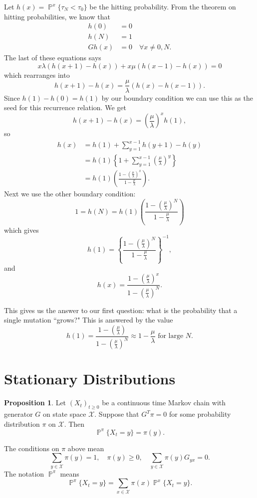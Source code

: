 \documentclass{article}
\theoremstyle{definition}
\newtheorem{prop}{Proposition}
\DeclareMathOperator{\p}{\mathbb{P}}
\begin{document}
Let $h(x) = \p^x\{\tau_N<\tau_0\}$ be the hitting probability. From the theorem on hitting probabilities, we know that 
\begin{align*}
	h(0) &= 0 \\
	h(N) &= 1\\
	Gh(x) &= 0 \quad \forall x\neq 0, N.
\end{align*}
The last of these equations says
\[
	x\lambda (h(x+1) - h(x)) + x \mu( h(x-1)-h(x)) = 0
\]
which rearranges into
\[
	h(x+1) - h(x) = \frac{\mu}{\lambda} (h(x) - h(x-1)).
\]
Since $h(1) - h(0) = h(1)$ by our boundary condition we can use this as the seed for this recurrence relation. We get
\[
	h(x+1) - h(x) = \left(\frac{\mu}{\lambda}\right)^x h(1),
\]
so
\begin{align*}
	h(x) &= h(1) + \sum_{y=1}^{x-1} h(y+1) - h(y)\\
	&= h(1)\left\{1 + \sum_{y=1}^{x-1} \left(\frac{\mu}{\lambda}\right)^y\right\}\\
	&= h(1) \left(\frac{1- \left(\frac{\mu}{\lambda}\right)^x}{1-\frac{\mu}{\lambda}}\right).
\end{align*}
Next we use the other boundary condition:
\[
	1 = h(N) = h(1)\left(\frac{1- \left(\frac{\mu}{\lambda}\right)^N}{1-\frac{\mu}{\lambda}}\right)
\]
which gives
\[
	h(1) =  \left\{\frac{1- \left(\frac{\mu}{\lambda}\right)^N}{1-\frac{\mu}{\lambda}}\right\}^{-1},
\]
and
\[
	h(x) = \frac{1- \left(\frac{\mu}{\lambda}\right)^x}{1 - \left(\frac{\mu}{\lambda}\right)^N} .
\]

This gives us the answer to our first question: what is the probability that a single mutation ``grows?" This is answered by the value 
\[
	h(1) =  \frac{1- \left(\frac{\mu}{\lambda}\right)}{1 - \left(\frac{\mu}{\lambda}\right)^N} \approx 1-\frac{\mu}{\lambda} \text{ for large }N.
\]

\section*{Stationary Distributions} 

\begin{prop}
Let $(X_t)_{t\geq 0}$ be a continuous time Markov chain with generator $G$ on state space $\mathcal{X}$. Suppose that $G^T \pi = 0$ for some probability distribution $\pi$ on $\mathcal{X}$. Then
\[
	\p^\pi\{X_t = y\} = \pi(y).
\]
\end{prop}

The conditions on $\pi$ above mean
\[
	\sum_{y\in \mathcal{X}} \pi(y) = 1, \quad \pi(y)\geq 0, \quad \sum_{y\in \mathcal{X}} \pi(y) G_{yx} = 0.
\]
The notation $\p^\pi$ means
\[
	\p^\pi\{X_t=y\} = \sum_{x\in\mathcal{X}} \pi(x) \p^x\{X_t=y\}.
\]
\end{document}

